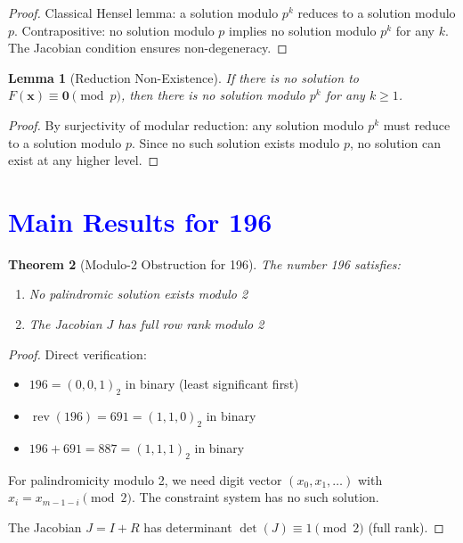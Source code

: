 \documentclass[11pt,a4paper]{article}
\theoremstyle{plain}
\newtheorem{theorem}{Theorem}[section]
\newtheorem{lemma}[theorem]{Lemma}
\theoremstyle{definition}
\DeclareMathOperator{\rev}{rev}
\begin{document}
\begin{proof}
Classical Hensel lemma: a solution modulo $p^k$ reduces to a solution modulo $p$. Contrapositive: no solution modulo $p$ implies no solution modulo $p^k$ for any $k$. The Jacobian condition ensures non-degeneracy.
\end{proof}

\begin{lemma}[Reduction Non-Existence]\label{lem:reduction}
If there is no solution to $F(\mathbf{x}) \equiv \mathbf{0} \pmod{p}$, then there is no solution modulo $p^k$ for any $k \geq 1$.
\end{lemma}

\begin{proof}
By surjectivity of modular reduction: any solution modulo $p^k$ must reduce to a solution modulo $p$. Since no such solution exists modulo $p$, no solution can exist at any higher level.
\end{proof}

\section{\textcolor{blue}{Main Results for 196}}

\begin{theorem}[Modulo-2 Obstruction for 196]\label{thm:mod2_196}
The number 196 satisfies:
\begin{enumerate}
\item No palindromic solution exists modulo 2
\item The Jacobian $J$ has full row rank modulo 2
\end{enumerate}
\end{theorem}

\begin{proof}
Direct verification:
\begin{itemize}
\item $196 = (0, 0, 1)_2$ in binary (least significant first)
\item $\rev(196) = 691 = (1, 1, 0)_2$ in binary
\item $196 + 691 = 887 = (1, 1, 1)_2$ in binary
\end{itemize}

For palindromicity modulo 2, we need digit vector $(x_0, x_1, \ldots)$ with $x_i = x_{m-1-i} \pmod{2}$. The constraint system has no such solution.

The Jacobian $J = I + R$ has determinant $\det(J) \equiv 1 \pmod{2}$ (full rank).
\end{proof}
\end{document}
